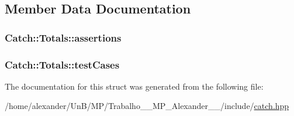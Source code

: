 \subsection{Member Data Documentation}
\hypertarget{structCatch_1_1Totals_a885ded66df752147b30c3d45aa602ec9}{
\subsubsection[{assertions}]{ Catch\-::\-Totals\-::assertions}}\label{structCatch_1_1Totals_a885ded66df752147b30c3d45aa602ec9}
\hypertarget{structCatch_1_1Totals_adb195fe477aedee2ecea88c888f16506}{
\subsubsection[{test\-Cases}]{ Catch\-::\-Totals\-::test\-Cases}}\label{structCatch_1_1Totals_adb195fe477aedee2ecea88c888f16506}


The documentation for this struct was generated from the following file\-:\begin{DoxyCompactItemize}
\item 
/home/alexander/\-Un\-B/\-M\-P/\-Trabalho\-\_\-\_\-\-M\-P\-\_\-\-Alexander\-\_\-\_/include/\hyperlink{catch_8hpp}{catch.\-hpp}\end{DoxyCompactItemize}
